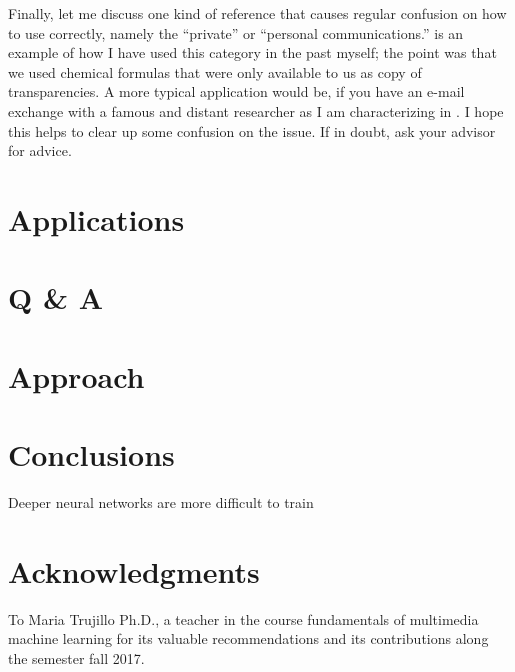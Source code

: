 \documentclass[12pt]{article}
\numberwithin{equation}{section}
\numberwithin{table}{section}
\numberwithin{figure}{section}
\begin{document}
Finally, let me discuss one kind of reference that causes regular
confusion on how to use correctly, namely the ``private'' or ``personal
communications.''
\cite{Ho95} is an example of how I have used this category in the past myself;
the point was that we used chemical formulas that were only
available to us as copy of transparencies. A more typical application
would be, if you have an e-mail exchange with a famous and distant researcher
as I am characterizing in \cite{BigShot}. I hope this helps to clear
up some confusion on the issue. If in doubt, ask your advisor for advice.

\section{Applications} \label{applications}




\section{Q \& A} \label{qa}

\section{Approach} \label{approach}


\section{Conclusions}

Deeper neural networks are more difficult to train \cite{Zagoruyko2016}






\section*{Acknowledgments}

To Maria Trujillo Ph.D., a teacher in the course fundamentals of multimedia machine learning for its valuable recommendations and its contributions along the semester fall 2017.
 




\end{document}
